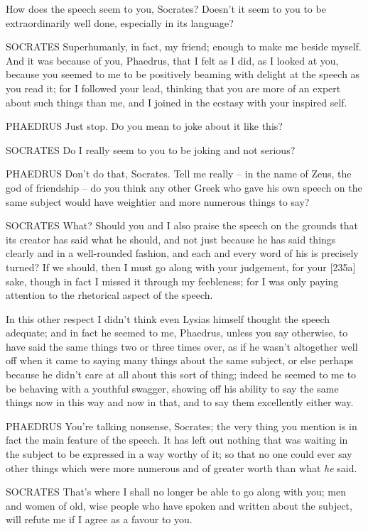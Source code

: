 How does the speech seem to you, Socrates? Doesn't it seem to you to be
extraordinarily well done, especially in its language?

SOCRATES Superhumanly, in fact, my friend; enough to make  me
beside myself. And it was because of you, Phaedrus, that I felt as I
did, as I looked at you, because you seemed to me to be positively
beaming with delight at the speech as you read it; for I followed your
lead, thinking that you are more of an  expert about such things
than me, and I joined in the ecstasy with your
inspired self.

PHAEDRUS Just stop. Do you mean to joke about it like this?

SOCRATES Do I really seem to you to be joking and not serious?

PHAEDRUS Don't do that, Socrates. Tell me really -- in the name 
of Zeus, the god of friendship -- do you think any other Greek who gave
his own speech on the same subject would have weightier and more
numerous things to say?

 SOCRATES What? Should you and I also praise the speech on the
grounds that its creator
has said what he should, and not just because he has said things clearly
and in a well-rounded fashion, and each and every word of his is
precisely turned? If we should, then I must go along with your
judgement, for your {[}235a{]} sake, though in fact I missed
it through my feebleness;
for I was only paying attention to the rhetorical aspect of the speech.

In this other respect I didn't think even Lysias himself thought the
speech adequate; and in fact he seemed to me, Phaedrus, unless you say
otherwise, to have said the same things two or  three times
over, as if he wasn't altogether well off when it came to saying many
things about the same subject, or else perhaps because he didn't care at
all about this sort of thing; indeed he seemed to me to be behaving with
a youthful swagger, showing off his ability to say the same things now
in this way and now in that, and to say them excellently either way.

 PHAEDRUS You're talking nonsense, Socrates; the very thing you
mention is in fact the main feature of the speech. It has left out
nothing that was waiting in the subject to be expressed in a way worthy
of it; so that no one could ever say other things  which were
more numerous and of greater worth than what {\em he} said.

SOCRATES That's where I shall no longer be able to go along with you;
men and women of old, wise people who have spoken and written about the
subject, will refute me if I agree as a favour to you.

